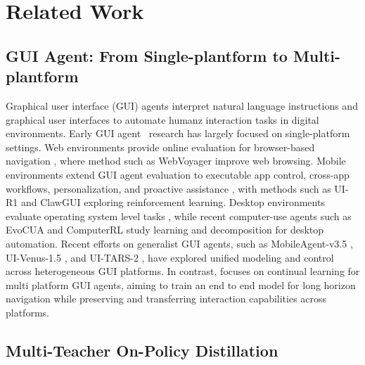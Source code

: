 \section{Related Work}
\label{sec:related}


\subsection{GUI Agent: From Single-plantform to Multi-plantform}

Graphical user interface (GUI) agents interpret natural language
instructions and graphical user interfaces to automate humanz
interaction tasks in digital environments. Early GUI agent~\citep{xiaomigui0} research has largely focused on single-platform settings. Web environments provide online evaluation for browser-based navigation \citep{zhou2024webarena, koh2024visualwebarena}, where method such as WebVoyager improve web browsing. Mobile environments extend GUI agent evaluation to executable app control, cross-app workflows, personalization, and proactive assistance \citep{androidworld, mobileworld, Knowu-bench}, with methods such as UI-R1 \citep{UI-R1} and ClawGUI \citep{clawgui} exploring reinforcement learning. Desktop environments evaluate operating system level tasks \citep{osworld, bonatti2024windows, yang2026macosworld}, while recent computer-use agents such as EvoCUA \citep{evocua} and ComputerRL \citep{lai2025computerrl} study learning and decomposition for desktop automation. Recent efforts on generalist GUI agents, such as MobileAgent-v3.5 \citep{Mobile-agent-v3.5}, UI-Venus-1.5 \citep{UI-venus-1.5}, and UI-TARS-2 \citep{UI-TARS-2}, have explored unified modeling and control across heterogeneous GUI platforms. In contrast,
\METHODNAME focuses on continual learning for multi platform GUI agents, aiming
to train an end to end model for long horizon navigation while preserving
and transferring interaction capabilities across platforms.



\subsection{Multi-Teacher On-Policy Distillation}

